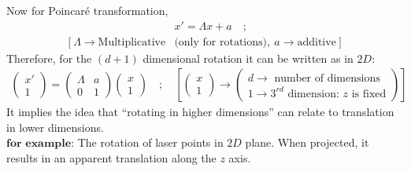 \documentclass[14pt]{article} %
\begin{document}
\noindent Now for Poincaré transformation,
\begin{align*} 
&x' = \Lambda x + a \quad;\\
[~\Lambda \rightarrow \text{Multiplicative} &\text{(only for rotations)},~a \rightarrow \text{additive}~]
\end{align*}
Therefore, for the $(d + 1)$ dimensional rotation it can be written as in $2D$:
\begin{align*}
\begin{pmatrix}
x' \\
1
\end{pmatrix}
=
\begin{pmatrix}
\Lambda & a \\
0 & 1
\end{pmatrix}
\begin{pmatrix}
x \\
1
\end{pmatrix}
\quad;\quad\left[
\begin{pmatrix}
x \\
1
\end{pmatrix}
\to
\begin{pmatrix}
d \rightarrow \text{ number of dimensions} \\
1 \rightarrow 3^{rd} \text{ dimension: } z \text{ is fixed} 
\end{pmatrix}
\right]
\end{align*}
It implies the idea that ``rotating in higher dimensions'' can relate to translation in lower dimensions. \\ $\textbf{for example:}$  The rotation of laser points in $2D$ plane. When projected, it results in an apparent translation along the $z$ axis. \\
\end{document}
